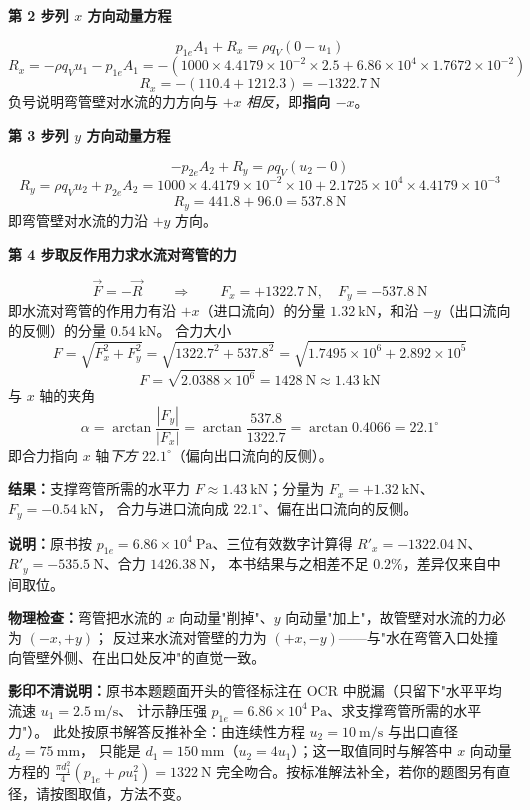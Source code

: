 \begin{jie}
\textbf{第 2 步\quad 列 $x$ 方向动量方程}

\[ p_{1e}A_1+R_x=\rho q_V\left(0-u_1\right) \]
\[ R_x=-\rho q_Vu_1-p_{1e}A_1=-\left(1000\times4.4179\times10^{-2}\times2.5+6.86\times10^4\times1.7672\times10^{-2}\right) \]
\[ R_x=-\left(110.4+1212.3\right)=-1322.7\ \mathrm{N} \]
负号说明弯管壁对水流的力方向与 $+x$ \emph{相反}，即\textbf{指向 $-x$}。

\textbf{第 3 步\quad 列 $y$ 方向动量方程}

\[ -p_{2e}A_2+R_y=\rho q_V\left(u_2-0\right) \]
\[ R_y=\rho q_Vu_2+p_{2e}A_2=1000\times4.4179\times10^{-2}\times10+2.1725\times10^4\times4.4179\times10^{-3} \]
\[ R_y=441.8+96.0=537.8\ \mathrm{N} \]
即弯管壁对水流的力沿 $+y$ 方向。

\textbf{第 4 步\quad 取反作用力求水流对弯管的力}

\[ \vec F=-\vec R\qquad\Longrightarrow\qquad
   F_x=+1322.7\ \mathrm{N},\quad F_y=-537.8\ \mathrm{N} \]
即水流对弯管的作用力有沿 $+x$（进口流向）的分量 $1.32\ \mathrm{kN}$，和沿 $-y$（出口流向的反侧）的分量 $0.54\ \mathrm{kN}$。
合力大小
\[ F=\sqrt{F_x^2+F_y^2}=\sqrt{1322.7^2+537.8^2}=\sqrt{1.7495\times10^6+2.892\times10^5} \]
\[ F=\sqrt{2.0388\times10^6}=1428\ \mathrm{N}\approx1.43\ \mathrm{kN} \]
与 $x$ 轴的夹角
\[ \alpha=\arctan\frac{|F_y|}{|F_x|}=\arctan\frac{537.8}{1322.7}=\arctan0.4066=22.1^\circ \]
即合力指向 $x$ 轴\emph{下方} $22.1^\circ$（偏向出口流向的反侧）。

\textbf{结果：}支撑弯管所需的水平力 $F\approx1.43\ \mathrm{kN}$；分量为 $F_x=+1.32\ \mathrm{kN}$、$F_y=-0.54\ \mathrm{kN}$，
合力与进口流向成 $22.1^\circ$、偏在出口流向的反侧。

\textbf{说明：}原书按 $p_{1e}=6.86\times10^4\ \mathrm{Pa}$、三位有效数字计算得
$R'_x=-1322.04\ \mathrm{N}$、$R'_y=-535.5\ \mathrm{N}$、合力 $1426.38\ \mathrm{N}$，
本书结果与之相差不足 $0.2\%$，差异仅来自中间取位。

\textbf{物理检查：}弯管把水流的 $x$ 向动量"削掉"、$y$ 向动量"加上"，故管壁对水流的力必为 $(-x,+y)$；
反过来水流对管壁的力为 $(+x,-y)$——与"水在弯管入口处撞向管壁外侧、在出口处反冲"的直觉一致。
\end{jie}

\begin{tishi}
\textbf{影印不清说明：}原书本题题面开头的管径标注在 OCR 中脱漏（只留下"水平平均流速 $u_1=2.5\ \mathrm{m/s}$、
计示静压强 $p_{1e}=6.86\times10^4\ \mathrm{Pa}$、求支撑弯管所需的水平力"）。
此处按原书解答反推补全：由连续性方程 $u_2=10\ \mathrm{m/s}$ 与出口直径 $d_2=75\ \mathrm{mm}$，
只能是 $d_1=150\ \mathrm{mm}$（$u_2=4u_1$）；这一取值同时与解答中 $x$ 向动量方程的
$\frac{\pi d_1^2}{4}\left(p_{1e}+\rho u_1^2\right)=1322\ \mathrm{N}$ 完全吻合。按标准解法补全，若你的题图另有直径，请按图取值，方法不变。
\end{tishi}

